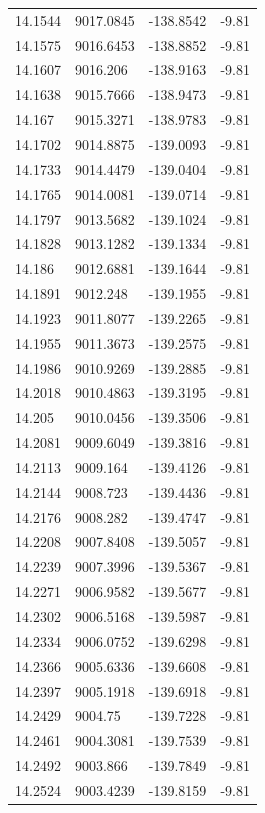 \begin{table}[H]
\begin{tabular}{llll}
14.1544 & 9017.0845 & -138.8542 & -9.81 \\
14.1575 & 9016.6453 & -138.8852 & -9.81 \\
14.1607 & 9016.206 & -138.9163 & -9.81 \\
14.1638 & 9015.7666 & -138.9473 & -9.81 \\
14.167 & 9015.3271 & -138.9783 & -9.81 \\
14.1702 & 9014.8875 & -139.0093 & -9.81 \\
14.1733 & 9014.4479 & -139.0404 & -9.81 \\
14.1765 & 9014.0081 & -139.0714 & -9.81 \\
14.1797 & 9013.5682 & -139.1024 & -9.81 \\
14.1828 & 9013.1282 & -139.1334 & -9.81 \\
14.186 & 9012.6881 & -139.1644 & -9.81 \\
14.1891 & 9012.248 & -139.1955 & -9.81 \\
14.1923 & 9011.8077 & -139.2265 & -9.81 \\
14.1955 & 9011.3673 & -139.2575 & -9.81 \\
14.1986 & 9010.9269 & -139.2885 & -9.81 \\
14.2018 & 9010.4863 & -139.3195 & -9.81 \\
14.205 & 9010.0456 & -139.3506 & -9.81 \\
14.2081 & 9009.6049 & -139.3816 & -9.81 \\
14.2113 & 9009.164 & -139.4126 & -9.81 \\
14.2144 & 9008.723 & -139.4436 & -9.81 \\
14.2176 & 9008.282 & -139.4747 & -9.81 \\
14.2208 & 9007.8408 & -139.5057 & -9.81 \\
14.2239 & 9007.3996 & -139.5367 & -9.81 \\
14.2271 & 9006.9582 & -139.5677 & -9.81 \\
14.2302 & 9006.5168 & -139.5987 & -9.81 \\
14.2334 & 9006.0752 & -139.6298 & -9.81 \\
14.2366 & 9005.6336 & -139.6608 & -9.81 \\
14.2397 & 9005.1918 & -139.6918 & -9.81 \\
14.2429 & 9004.75 & -139.7228 & -9.81 \\
14.2461 & 9004.3081 & -139.7539 & -9.81 \\
14.2492 & 9003.866 & -139.7849 & -9.81 \\
14.2524 & 9003.4239 & -139.8159 & -9.81 \\

\end{tabular}
\end{table}
